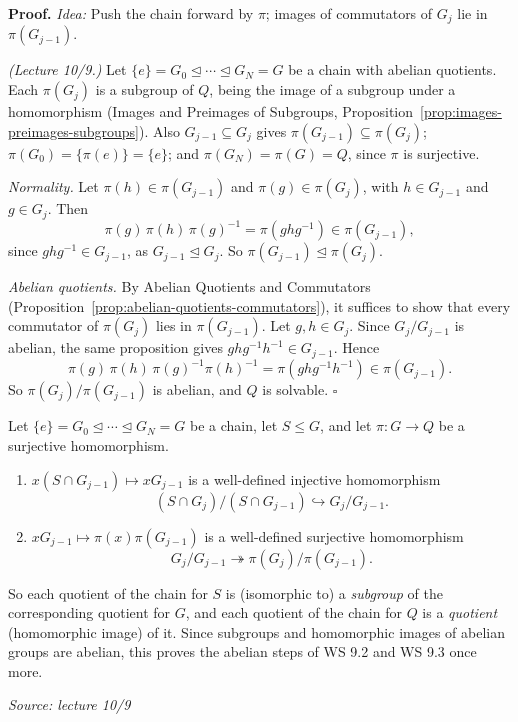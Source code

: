 \documentclass[11pt]{report}
\renewenvironment{proof}[1][Proof]{\noindent\textbf{#1.} }{\hfill$\square$\par\vspace{5pt}}
\newcommand{\srcline}[1]{\par\hfill{\footnotesize\textit{Source: #1}}}
\begin{document}
\begin{proof}
\textit{Idea:} Push the chain forward by $\pi$; images of commutators of $G_j$ lie in $\pi(G_{j-1})$.\par
\textit{(Lecture 10/9.)} Let $\{e\} = G_0 \trianglelefteq \cdots \trianglelefteq G_N = G$ be a chain with abelian quotients. Each $\pi(G_j)$ is a subgroup of $Q$, being the image of a subgroup under a homomorphism (Images and Preimages of Subgroups, Proposition~\ref{prop:images-preimages-subgroups}). Also $G_{j-1} \subseteq G_j$ gives $\pi(G_{j-1}) \subseteq \pi(G_j)$; $\pi(G_0) = \{\pi(e)\} = \{e\}$; and $\pi(G_N) = \pi(G) = Q$, since $\pi$ is surjective.

\emph{Normality.} Let $\pi(h) \in \pi(G_{j-1})$ and $\pi(g) \in \pi(G_j)$, with $h \in G_{j-1}$ and $g \in G_j$. Then
\[ \pi(g)\,\pi(h)\,\pi(g)^{-1} = \pi(ghg^{-1}) \in \pi(G_{j-1}), \]
since $ghg^{-1} \in G_{j-1}$, as $G_{j-1} \trianglelefteq G_j$. So $\pi(G_{j-1}) \trianglelefteq \pi(G_j)$.

\emph{Abelian quotients.} By Abelian Quotients and Commutators (Proposition~\ref{prop:abelian-quotients-commutators}), it suffices to show that every commutator of $\pi(G_j)$ lies in $\pi(G_{j-1})$. Let $g, h \in G_j$. Since $G_j/G_{j-1}$ is abelian, the same proposition gives $ghg^{-1}h^{-1} \in G_{j-1}$. Hence
\[ \pi(g)\,\pi(h)\,\pi(g)^{-1}\pi(h)^{-1} = \pi(ghg^{-1}h^{-1}) \in \pi(G_{j-1}). \]
So $\pi(G_j)/\pi(G_{j-1})$ is abelian, and $Q$ is solvable.
\end{proof}

\begin{propbox}\label{prop:subquotient-maps}
Let $\{e\} = G_0 \trianglelefteq \cdots \trianglelefteq G_N = G$ be a chain, let $S \leq G$, and let $\pi: G \to Q$ be a surjective homomorphism.
\begin{enumerate}
    \item $x(S \cap G_{j-1}) \mapsto xG_{j-1}$ is a well-defined injective homomorphism
    \[ (S \cap G_j)/(S \cap G_{j-1}) \hookrightarrow G_j/G_{j-1}. \]
    \item $xG_{j-1} \mapsto \pi(x)\pi(G_{j-1})$ is a well-defined surjective homomorphism
    \[ G_j/G_{j-1} \twoheadrightarrow \pi(G_j)/\pi(G_{j-1}). \]
\end{enumerate}
So each quotient of the chain for $S$ is (isomorphic to) a \emph{subgroup} of the corresponding quotient for $G$, and each quotient of the chain for $Q$ is a \emph{quotient} (homomorphic image) of it. Since subgroups and homomorphic images of abelian groups are abelian, this proves the abelian steps of WS 9.2 and WS 9.3 once more.
\srcline{lecture 10/9}
\end{propbox}
\end{document}
